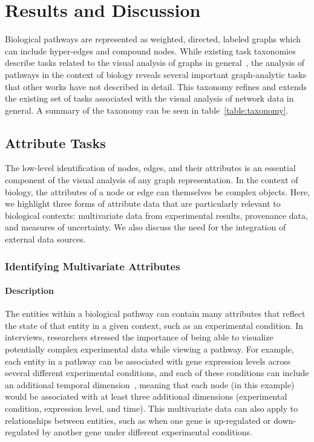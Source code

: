 \documentclass[twocolumn]{bmcart}%
\begin{document}
\section*{Results and Discussion}

Biological pathways are represented as weighted, directed, labeled graphs which can include hyper-edges and compound nodes.
While existing task taxonomies describe tasks related to the visual analysis of graphs in general~\cite{Ahn2014, Pretorius2014}, the analysis of pathways in the context of biology reveals several important graph-analytic tasks that other works have not described in detail.
This taxonomy refines and extends the existing set of tasks associated with the visual analysis of network data in general.
A summary of the taxonomy can be seen in table~\ref{table:taxonomy}.

\subsection*{Attribute Tasks}

The low-level identification of nodes, edges, and their attributes is an essential component of the visual analysis of any graph representation.
In the context of biology, the attributes of a node or edge can themselves be complex objects.
Here, we highlight three forms of attribute data that are particularly relevant to biological contexts: multivariate data from experimental results, provenance data, and measures of uncertainty.
We also discuss the need for the integration of external data sources.

\subsubsection*{Identifying Multivariate Attributes}

\paragraph*{Description}

The entities within a biological pathway can contain many attributes that reflect the state of that entity in a given context, such as an experimental condition.
In interviews, researchers stressed the importance of being able to visualize potentially complex experimental data while viewing a pathway.
For example, each entity in a pathway can be associated with gene expression levels across several different experimental conditions, and each of these conditions can include an additional temporal dimension~\cite{Barsky2008cerebral}, meaning that each node (in this example) would be associated with at least three additional dimensions (experimental condition, expression level, and time).
This multivariate data can also apply to relationships between entities, such as when one gene is up-regulated or down-regulated by another gene under different experimental conditions.
\end{document}
